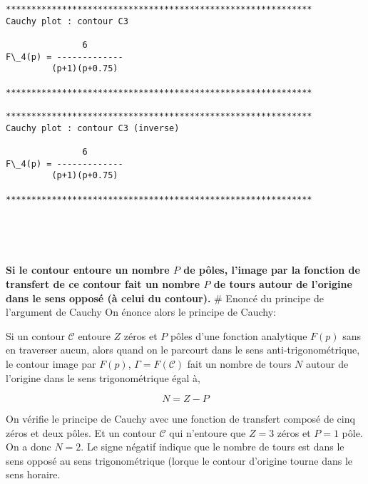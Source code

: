     \begin{Verbatim}[commandchars=\\\{\}]
************************************************************
Cauchy plot : contour C3

               6
F\_4(p) = -------------
         (p+1)(p+0.75)

************************************************************

************************************************************
Cauchy plot : contour C3 (inverse)

               6
F\_4(p) = -------------
         (p+1)(p+0.75)

************************************************************

    \end{Verbatim}

    \begin{center}
    \end{center}
    { \hspace*{\fill} \\}
    
    \begin{center}
    \end{center}
    { \hspace*{\fill} \\}
    
    \textbf{Si le contour entoure un nombre \(P\) de pôles, l'image par la
fonction de transfert de ce contour fait un nombre \(P\) de tours autour
de l'origine dans le sens opposé (à celui du contour).} \# Enoncé du
principe de l'argument de Cauchy On énonce alors le principe de Cauchy:

Si un contour \(\mathcal{C}\) entoure \(Z\) zéros et \(P\) pôles d'une
fonction analytique \(F(p)\) sans en traverser aucun, alors quand on le
parcourt dans le sens anti-trigonométrique, le contour image par
\(F(p)\), \(\Gamma=F(\mathcal{C})\) fait un nombre de tours \(N\) autour
de l'origine dans le sens trigonométrique égal à,

\[
    N=Z-P
\]

On vérifie le principe de Cauchy avec une fonction de transfert composé
de cinq zéros et deux pôles. Et un contour \(\mathcal{C}\) qui n'entoure
que \(Z=3\) zéros et \(P=1\) pôle. On a donc \(N=2\). Le signe négatif
indique que le nombre de tours est dans le sens opposé au sens
trigonométrique (lorque le contour d'origine tourne dans le sens
horaire.

